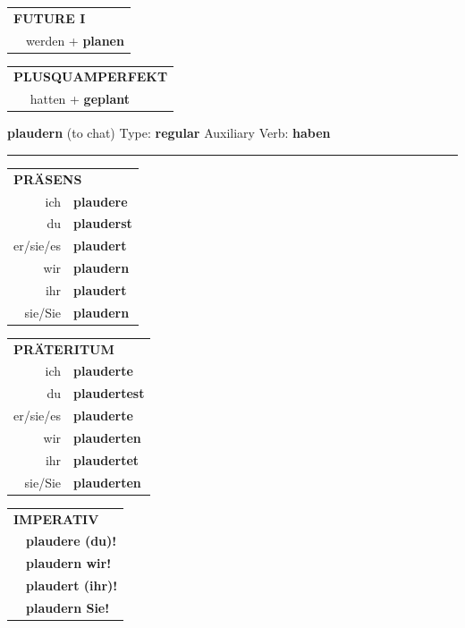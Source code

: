 \documentclass[10pt,a4paper]{revtex4-2}
\begin{document}
\begin{verbbox-acc}
\begin{tabular}{rl}
    \multicolumn{2}{l}{\textbf{FUTURE I} }\\
   & werden + \textbf{planen}\\
 
  \end{tabular}
\hfill
   \begin{tabular}{rl}
      \multicolumn{2}{l}{\textbf{PLUSQUAMPERFEKT}}\\
   & hatten + \textbf{geplant}\\
  \end{tabular}
  
  \vspace{-5pt}


\end{verbbox-acc}

\begin{verbbox}
{\Large \bf plaudern} (to chat) \hfill Type: \textbf{regular} \hfill Auxiliary Verb: \textbf{haben}

\vspace{5pt}
\hrule
\vspace{5pt}

\begin{tabular}{rl}
\multicolumn{2}{l}{\textbf{PRÄSENS}}\\
ich & \textbf{plaudere}\\
du & \textbf{plauderst}\\
er/sie/es & \textbf{plaudert}\\
wir & \textbf{plaudern}\\
ihr & \textbf{plaudert}\\
sie/Sie & \textbf{plaudern}\\
\end{tabular}
\hfill
\begin{tabular}{rl}
\multicolumn{2}{l}{\textbf{PRÄTERITUM}}\\
ich & \textbf{plauderte}\\
du & \textbf{plaudertest}\\
er/sie/es & \textbf{plauderte}\\
wir & \textbf{plauderten}\\
ihr & \textbf{plaudertet}\\
sie/Sie & \textbf{plauderten}\\
\end{tabular}
\hfill
\begin{tabular}{rl}
\multicolumn{2}{l}{\textbf{IMPERATIV}}\\
& \textbf{plaudere (du)!}\\
& \textbf{plaudern wir!}\\
& \textbf{plaudert (ihr)!}\\
& \textbf{plaudern Sie!}\\
\end{tabular}


\end{verbbox}
\end{document}
